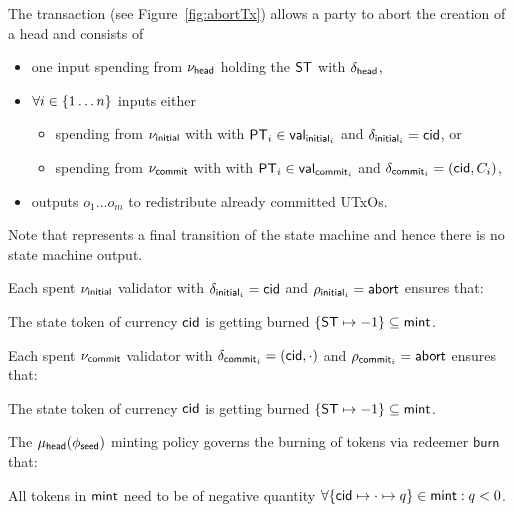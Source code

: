 The \mtxAbort{} transaction (see Figure~\ref{fig:abortTx}) allows a
party to abort the creation of a head and consists of
\begin{itemize}
	\item one input spending from $\nu_\mathsf{head}$ holding the $\mathsf{ST}$ with $\delta_{\mathsf{head}}$,
	\item $\forall i \in \{1 \dots n\}$ inputs either
	      \begin{itemize}
		      \item spending from $\nu_{\mathsf{initial}}$ with with $\mathsf{PT}_{i} \in \mathsf{val}_{\mathsf{initial}_{i}}$ and $\delta_{\mathsf{initial}_{i}} = \mathsf{cid}$, or
		      \item spending from $\nu_{\mathsf{commit}}$ with with $\mathsf{PT}_{i} \in \mathsf{val}_{\mathsf{commit}_{i}}$ and $\delta_{\mathsf{commit}_{i}} = (\mathsf{cid}, C_{i})$,
	      \end{itemize}
	\item outputs $o_{1} \dots o_{m}$ to redistribute already committed UTxOs.
\end{itemize}

Note that \mtxAbort{} represents a final transition of the state
machine and hence there is no state machine output.

\noindent Each spent $\nu_{\mathsf{initial}}$ validator with $\delta_{\mathsf{initial}_{i}} = \mathsf{cid}$ and $\rho_{\mathsf{initial}_{i}} = \mathsf{abort}$ ensures that:
\begin{menumerate}
	\item The state token of currency $\mathsf{cid}$ is getting burned $\{\mathsf{ST} \mapsto -1\} \subseteq \mathsf{mint}$.
\end{menumerate}

\noindent Each spent $\nu_{\mathsf{commit}}$ validator with $\delta_{\mathsf{commit}_{i}} = (\mathsf{cid},\cdot)$ and $\rho_{\mathsf{commit}_{i}} = \mathsf{abort}$ ensures that:
\begin{menumerate}
	\item The state token of currency $\mathsf{cid}$ is getting burned $\{\mathsf{ST} \mapsto -1\} \subseteq \mathsf{mint}$.
\end{menumerate}

\noindent The $\mu_\mathsf{head}(\phi_{\mathsf{seed}})$ minting policy governs the burning of tokens via
redeemer $\mathsf{burn}$ that:
\begin{menumerate}
	\item All tokens in $\mathsf{mint}$ need to be of negative quantity
	$\forall \{\mathsf{cid} \mapsto \cdot \mapsto q\} \in \mathsf{mint} : q < 0$.
\end{menumerate}

